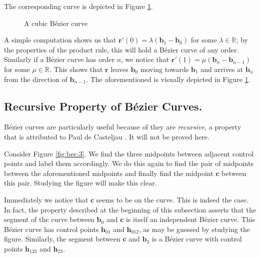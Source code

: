 \documentclass{article}
\begin{document}
The corresponding curve is depicted in Figure \ref{fig:bec:2}.

\begin{figure}
  \centering
  \caption{A cubic B\'ezier curve}
  \label{fig:bec:2}
\end{figure}

A simple computation shows us that $\mathbf{r} ' (0) = \lambda(\mathbf{b}_1 - \mathbf{b}_0)$ for some $\lambda \in \mathbb{R}$; by the properties of the product rule, this will hold a B\'ezier curve of any order.
Similarly if a B\'ezier curve has order $n$, we notice that $\mathbf{r} ' (1) = \mu (\mathbf{b}_n - \mathbf{b}_{n-1})$ for some $\mu \in \mathbb{R}$.
This shows that $\mathbf{r}$ leaves $\mathbf{b}_0$ moving towards $\mathbf{b}_1$ and arrives at $\mathbf{b}_n$ from the direction of $\mathbf{b}_{n-1}$.
The aforementioned is visually depicted in Figure \ref{fig:bec:2}.

\subsection{Recursive Property of B\'ezier Curves.}
\label{sec:bec:1}

B\'ezier curves are particularly useful because of they are \emph{recursive}, a property that is attributed to Paul de Casteljau \cite{casselman08}.
It will not be proved here.

Consider Figure \ref{fig:bec:3}.
We find the three midpoints between adjacent control points and label them accordingly.
We do this again to find the pair of midpoints between the aforementioned midpoints and finally find the midpoint $\mathbf{c}$ between this pair.
Studying the figure will make this clear.

Immediately we notice that $\mathbf{c}$ seems to be on the curve.
This is indeed the case.
In fact, the property described at the beginning of this subsection asserts that the segment of the curve between $\mathbf{b}_0$ and $\mathbf{c}$ is itself an independent B\'ezier curve.
This B\'ezier curve has control points $\mathbf{h}_{01}$ and $\mathbf{h}_{012}$, as may be guessed by studying the figure.
Similarly, the segment between $\mathbf{c}$ and $\mathbf{b}_3$ is a B\'ezier curve with control points $\mathbf{h}_{123}$ and $\mathbf{h}_{23}$.
\end{document}
